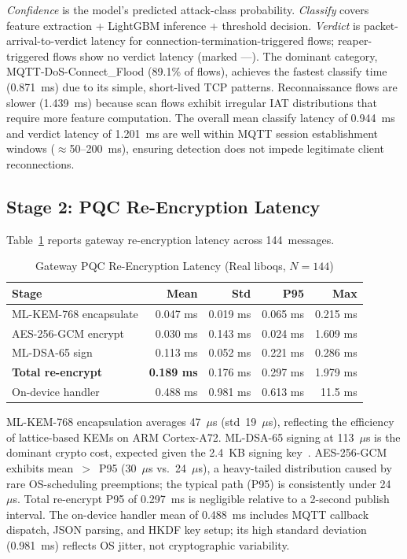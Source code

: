 \documentclass[conference]{IEEEtran}
\begin{document}
\textit{Confidence} is the model's predicted attack-class probability. \textit{Classify} covers feature extraction + LightGBM inference + threshold decision. \textit{Verdict} is packet-arrival-to-verdict latency for connection-termination-triggered flows; reaper-triggered flows show no verdict latency (marked ---). The dominant category, MQTT-DoS-Connect\_Flood (89.1\% of flows), achieves the fastest classify time (0.871~ms) due to its simple, short-lived TCP patterns. Reconnaissance flows are slower (1.439~ms) because scan flows exhibit irregular IAT distributions that require more feature computation. The overall mean classify latency of 0.944~ms and verdict latency of 1.201~ms are well within MQTT session establishment windows ($\approx$50--200~ms), ensuring detection does not impede legitimate client reconnections.

\subsection{Stage 2: PQC Re-Encryption Latency}

Table~\ref{tab:pqc} reports gateway re-encryption latency across 144~messages.

\begin{table}[!t]
\centering
\captionsetup{font=footnotesize, skip=2pt}
\caption{Gateway PQC Re-Encryption Latency (Real liboqs, $N=144$)}
\label{tab:pqc}
\footnotesize
\setlength{\tabcolsep}{3.5pt}
\begin{tabular}{lrrrr}
\toprule
\textbf{Stage} & \textbf{Mean} & \textbf{Std} & \textbf{P95} & \textbf{Max} \\
\midrule
ML-KEM-768 encapsulate & 0.047 ms & 0.019 ms & 0.065 ms & 0.215 ms \\
AES-256-GCM encrypt    & 0.030 ms & 0.143 ms & 0.024 ms & 1.609 ms \\
ML-DSA-65 sign         & 0.113 ms & 0.052 ms & 0.221 ms & 0.286 ms \\
\midrule
\textbf{Total re-encrypt}   & \textbf{0.189 ms} & 0.176 ms & 0.297 ms & 1.979 ms \\
On-device handler           & 0.488 ms & 0.981 ms & 0.613 ms & 11.5 ms \\
\bottomrule
\end{tabular}
\vspace{-2mm}
\end{table}

ML-KEM-768 encapsulation averages 47~$\mu$s (std~19~$\mu$s), reflecting the efficiency of lattice-based KEMs on ARM Cortex-A72. ML-DSA-65 signing at 113~$\mu$s is the dominant crypto cost, expected given the 2.4~KB signing key~\cite{nist_fips204}. AES-256-GCM exhibits mean~$>$~P95 (30~$\mu$s vs.\ 24~$\mu$s), a heavy-tailed distribution caused by rare OS-scheduling preemptions; the typical path (P95) is consistently under 24~$\mu$s. Total re-encrypt P95 of 0.297~ms is negligible relative to a 2-second publish interval. The on-device handler mean of 0.488~ms includes MQTT callback dispatch, JSON parsing, and HKDF key setup; its high standard deviation (0.981~ms) reflects OS jitter, not cryptographic variability.
\end{document}
